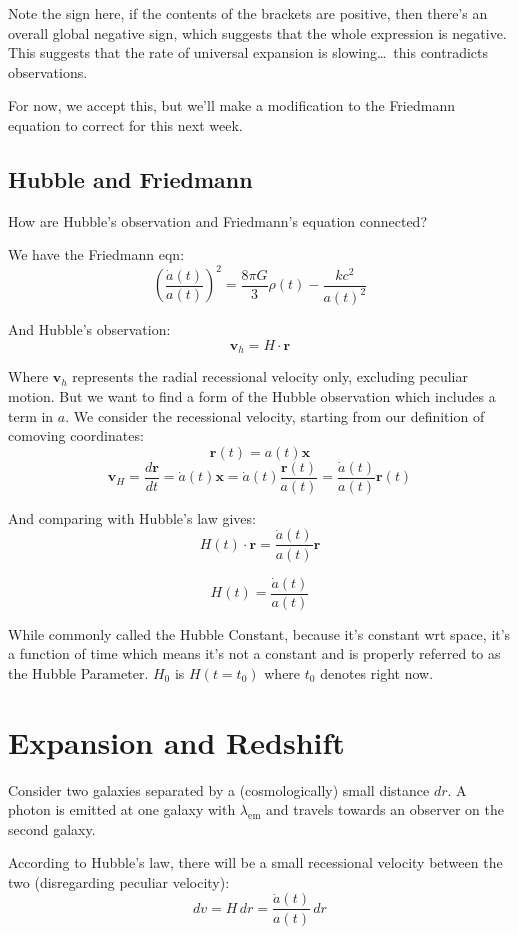 Note the sign here, if the contents of the brackets are positive, then there's an overall global negative sign, which suggests that the whole expression is negative. This suggests that the rate of universal expansion is slowing\dots\, this contradicts observations.

For now, we accept this, but we'll make a modification to the Friedmann equation to correct for this next week.

\subsection{Hubble and Friedmann}
How are Hubble's observation and Friedmann's equation connected?

We have the Friedmann eqn:
\[
    \left(\frac{\dot{a}(t)}{a(t)}\right)^2 =  \frac{8 \pi G}{3} \rho(t) - \frac{kc^2}{a(t)^2}
\]

And Hubble's observation:
\[
    \pmb{v}_h = H \cdot \pmb{r}
\]

Where $\pmb{v}_h$ represents the radial recessional velocity only, excluding peculiar motion. But we want to find a form of the Hubble observation which includes a term in $a$. We consider the recessional velocity, starting from our definition of comoving coordinates:
\[
    \pmb{r}(t) = a(t) \pmb{x}
\]
\[
    \pmb{v}_H = \frac{d \pmb{r}}{dt} = \dot{a}(t) \pmb{x} = \dot{a}(t) \frac{\pmb{r}(t)}{a(t)} = \frac{\dot{a}(t)}{a(t)} \pmb{r}(t)
\]

And comparing with Hubble's law gives:
\[
    H(t) \cdot \pmb{r} = \frac{\dot{a}(t)}{a(t)} \pmb{r}
\]

\[
    H(t) = \frac{\dot a(t)}{a(t)}
\]

While commonly called the Hubble Constant, because it's constant wrt space, it's a function of time which means it's not a constant and is properly referred to as the Hubble Parameter. $H_0$ is $H(t = t_0)$ where $t_0$ denotes right now.

\section{Expansion and Redshift}
Consider two galaxies separated by a (cosmologically) small distance $dr$. A photon is emitted at one galaxy with $\lambda_\text{em}$ and travels towards an observer on the second galaxy.

According to Hubble's law, there will be a small recessional velocity between the two (disregarding peculiar velocity):
\[
    dv = H\, dr = \frac{\dot{a}(t)}{a(t)}\, dr
\]

